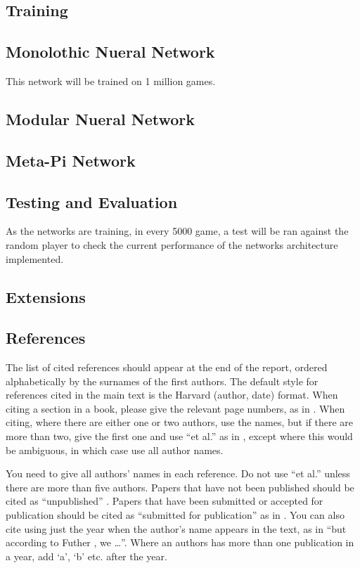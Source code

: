\documentclass[12pt,a4paper]{article}
\begin{document}
\subsection{Training}
\subsection{Monolothic Nueral Network}
This network will be trained on 1 million games. 
\subsection{Modular Nueral Network}
\subsection{Meta-Pi Network}


\subsection{Testing and Evaluation}
As the networks are training, in every 5000 game, a test will be ran against the random player to check the current performance of the networks architecture implemented. 

\subsection{Extensions}


\subsection{References}

The list of cited references should appear at the end of the report, ordered alphabetically by the surnames of the first authors.  The default style for references cited in the main text is the  Harvard (author, date) format.  When citing a section in a book, please give the relevant page numbers, as in \cite[p293]{budgen}.  When citing, where there are either one or two authors, use the names, but if there are more than two, give the first one and use ``et al.'' as in  , except where this would be ambiguous, in which case use all author names.

You need to give all authors' names in each reference.  Do not use ``et al.'' unless there are more than five authors.  Papers that have not been published should be cited as ``unpublished'' \cite{euther}.  Papers that have been submitted or accepted for publication should be cited as ``submitted for publication'' as in \cite{futher} .  You can also cite using just the year when the author's name appears in the text, as in ``but according to Futher \citeyear{futher}, we \dots''.  Where an authors has more than one publication in a year, add `a', `b' etc. after the year.





\end{document}
